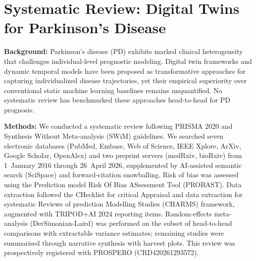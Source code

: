\chapter{Systematic Review: Digital Twins for Parkinson's Disease}
\label{sr:chapter}
\label{ch:sr}
\noindent\textbf{Background:}
Parkinson's disease (PD) exhibits marked clinical heterogeneity that challenges individual-level prognostic modeling. Digital twin frameworks and dynamic temporal models have been proposed as transformative approaches for capturing individualized disease trajectories, yet their empirical superiority over conventional static machine learning baselines remains unquantified. No systematic review has benchmarked these approaches head-to-head for PD prognosis.

\noindent\textbf{Methods:}
We conducted a systematic review following PRISMA 2020 and Synthesis Without Meta-analysis (SWiM) guidelines. We searched seven electronic databases (PubMed, Embase, Web of Science, IEEE Xplore, ArXiv, Google Scholar, OpenAlex) and two preprint servers (medRxiv, bioRxiv) from 1~January 2016 through 26~April 2026, supplemented by AI-assisted semantic search (SciSpace) and forward-citation snowballing. Risk of bias was assessed using the Prediction model Risk Of Bias ASsessment Tool (PROBAST). Data extraction followed the CHecklist for critical Appraisal and data extraction for systematic Reviews of prediction Modelling Studies (CHARMS) framework, augmented with TRIPOD+AI 2024 reporting items. Random-effects meta-analysis (DerSimonian-Laird) was performed on the subset of head-to-head comparisons with extractable variance estimates; remaining studies were summarised through narrative synthesis with harvest plots. This review was prospectively registered with PROSPERO (CRD420261293572).

